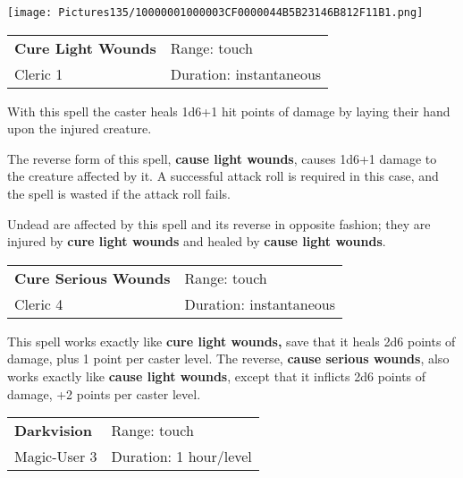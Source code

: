 \documentclass[a4paper,twoside,openany,10pt]{book}
\begin{document}
\begin{multicols}{2}
\begin{flushleft}
	\texttt{[image: Pictures135/10000001000003CF0000044B5B23146B812F11B1.png]}
\end{flushleft}

\smallskip\begin{flushleft} 
	\begin{tabularx}{0.45\textwidth}{@{}m{3.5cm}m{5.5cm}@{}} 
		\textbf{Cure Light Wounds } & Range: touch\\
		Cleric 1 &Duration: instantaneous\\
	\end{tabularx}\end{flushleft}

With this spell the caster heals 1d6+1 hit points of damage by laying
their hand upon the injured creature.

The reverse form of this spell, \textbf{cause light wounds}, causes 1d6+1 damage to the creature affected by it. A successful attack roll is required in this case, and the spell is wasted if the attack roll fails.

Undead are affected by this spell and its reverse in opposite fashion; they are injured by \textbf{cure light wounds} and healed by \textbf{cause light wounds}.

\smallskip\begin{flushleft} 
	\begin{tabularx}{0.45\textwidth}{@{}m{3.5cm}m{5.5cm}@{}} 
		\textbf{Cure Serious Wounds} & Range: touch\\
		Cleric 4 &Duration: instantaneous\\
	\end{tabularx}\end{flushleft}

This spell works exactly like \textbf{cure light wounds,} save that it heals 2d6 points of damage, plus 1 point per caster level. The reverse, \textbf{cause serious wounds}, also works exactly like \textbf{cause light wounds}, except that it inflicts 2d6 points of damage, +2 points per caster level.\medskip


\smallskip\begin{flushleft} 
	\begin{tabularx}{0.45\textwidth}{@{}m{3.5cm}m{5.5cm}@{}} 
		\textbf{Darkvision} & Range: touch\\
Magic-User 3 &Duration: 1 hour/level\\
	\end{tabularx}\end{flushleft}


\end{multicols}
\end{document}
